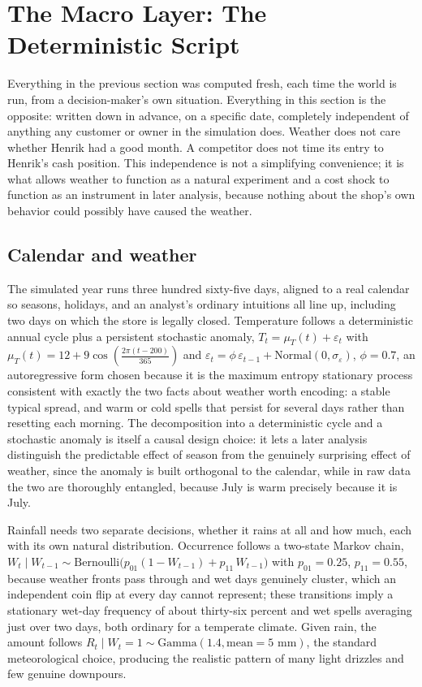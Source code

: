 \documentclass[12pt,a4paper]{article}
\begin{document}
\section{The Macro Layer: The Deterministic Script}
\label{sec:macro}

Everything in the previous section was computed fresh, each time the
world is run, from a decision-maker's own situation. Everything in this
section is the opposite: written down in advance, on a specific date,
completely independent of anything any customer or owner in the
simulation does. Weather does not care whether Henrik had a good month.
A competitor does not time its entry to Henrik's cash position. This
independence is not a simplifying convenience; it is what allows weather
to function as a natural experiment and a cost shock to function as an
instrument in later analysis, because nothing about the shop's own
behavior could possibly have caused the weather.

\subsection{Calendar and weather}

The simulated year runs three hundred sixty-five days, aligned to a real
calendar so seasons, holidays, and an analyst's ordinary intuitions all
line up, including two days on which the store is legally closed.
Temperature follows a deterministic annual cycle plus a persistent
stochastic anomaly, $T_t = \mu_T(t) + \varepsilon_t$ with $\mu_T(t) = 12
+ 9\cos\!\left(\tfrac{2\pi(t-200)}{365}\right)$ and $\varepsilon_t =
\phi\,\varepsilon_{t-1} + \text{Normal}(0,\sigma_\varepsilon)$,
$\phi=0.7$, an autoregressive form chosen because it is the maximum
entropy stationary process consistent with exactly the two facts about
weather worth encoding: a stable typical spread, and warm or cold spells
that persist for several days rather than resetting each morning. The
decomposition into a deterministic cycle and a stochastic anomaly is
itself a causal design choice: it lets a later analysis distinguish the
predictable effect of season from the genuinely surprising effect of
weather, since the anomaly is built orthogonal to the calendar, while in
raw data the two are thoroughly entangled, because July is warm
precisely because it is July.

Rainfall needs two separate decisions, whether it rains at all and how
much, each with its own natural distribution. Occurrence follows a
two-state Markov chain, $W_t \mid W_{t-1} \sim \text{Bernoulli}\big(
p_{01}(1-W_{t-1}) + p_{11}\,W_{t-1}\big)$ with $p_{01}=0.25$,
$p_{11}=0.55$, because weather fronts pass through and wet days genuinely
cluster, which an independent coin flip at every day cannot represent;
these transitions imply a stationary wet-day frequency of about
thirty-six percent and wet spells averaging just over two days, both
ordinary for a temperate climate. Given rain, the amount follows
$R_t \mid W_t{=}1 \sim \text{Gamma}(1.4, \text{mean}=5\text{ mm})$, the
standard meteorological choice, producing the realistic pattern of many
light drizzles and few genuine downpours.
\end{document}
